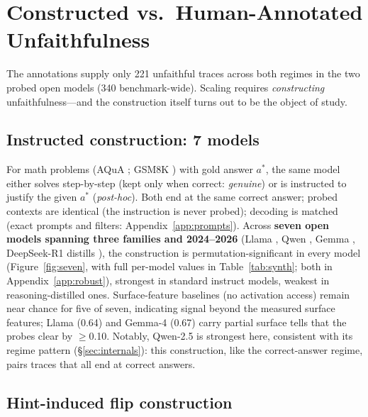 \documentclass{article}
\begin{document}
\section{Constructed vs.\ Human-Annotated Unfaithfulness}
\label{sec:construction}

The annotations supply only 221 unfaithful traces across both regimes in the two probed open models (340 benchmark-wide). Scaling requires \emph{constructing} unfaithfulness---and the construction itself turns out to be the object of study.

\subsection{Instructed construction: 7 models}
\label{sec:synth}

For math problems (AQuA \citep{ling2017aqua}; GSM8K \citep{cobbe2021gsm8k}) with gold answer $a^*$, the same model either solves step-by-step (kept only when correct: \emph{genuine}) or is instructed to justify the given $a^*$ (\emph{post-hoc}). Both end at the same correct answer; probed contexts are identical (the instruction is never probed); decoding is matched (exact prompts and filters: Appendix~\ref{app:prompts}). Across \textbf{seven open models spanning three families and 2024--2026} (Llama \citep{grattafiori2024llama3}, Qwen \citep{qwen2025qwen25}, Gemma \citep{gemmateam2024gemma2}, DeepSeek-R1 distills \citep{deepseek2025r1}), the construction is permutation-significant in every model (Figure~\ref{fig:seven}, with full per-model values in Table~\ref{tab:synth}; both in Appendix~\ref{app:robust}), strongest in standard instruct models, weakest in reasoning-distilled ones. Surface-feature baselines (no activation access) remain near chance for five of seven, indicating signal beyond the measured surface features; Llama (0.64) and Gemma-4 (0.67) carry partial surface tells that the probes clear by $\geq$0.10. Notably, Qwen-2.5 is strongest here, consistent with its regime pattern (\S\ref{sec:internals}): this construction, like the correct-answer regime, pairs traces that all end at correct answers.


\subsection{Hint-induced flip construction}
\label{sec:hint}
\end{document}
